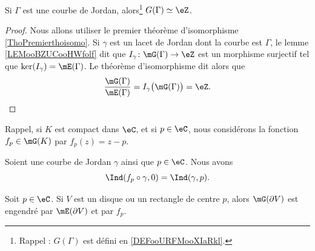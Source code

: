 \begin{corollary}     \label{CORooDOMAooHtKPTe}
	Si \( \Gamma\) est une courbe de Jordan, alors\footnote{Rappel : \( G(\Gamma)\) est défini en \ref{DEFooURFMooXIaRkl}.} \( G(\Gamma)\simeq \eZ \).
\end{corollary}

\begin{proof}
	Nous allons utiliser le premier théorème d'isomorphisme \ref{ThoPremierthoisomo}. Si \( \gamma\) est un lacet de Jordan dont la courbe est \( \Gamma\), le lemme \ref{LEMooBZUCooHWfolf} dit que \( I_{\gamma}\colon \mG(\Gamma)\to \eZ\) est un morphisme surjectif tel que \( \ker(I_{\gamma})=\mE(\Gamma)\). Le théorème d'isomorphisme dit alors que
	\begin{equation}
		\frac{\mG(\Gamma)}{ \mE(\Gamma) }=I_{\gamma}\big( \mG(\Gamma) \big)=\eZ.
	\end{equation}
\end{proof}

Rappel, si \( K\) est compact dans \( \eC\), et si \( p\in \eC\), nous considérons la fonction \( f_p\in\mG(K)\) par \( f_p(z)=z-p\).

\begin{lemma}        \label{LEMooAKVFooFMHaOZ}
	Soient une courbe de Jordan \( \gamma\) ainsi que \( p\in \eC\). Nous avons
	\begin{equation}
		\Ind(f_p\circ \gamma,0)=\Ind(\gamma,p).
	\end{equation}
\end{lemma}

\begin{proposition}       \label{PROPooUPPEooEQOOkh}
	Soit \( p\in \eC\).  Si \( V\) est un disque ou un rectangle de centre \( p\), alors \( \mG(\partial V)\) est engendré par \( \mE(\partial V)\) et par \( f_p\).
\end{proposition}

